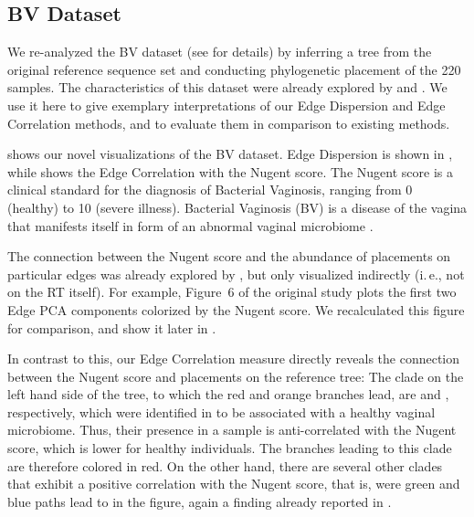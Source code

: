 \subsection{BV Dataset}
\label{ch:Visualization:sec:Results:sub:BVDataset}

We re-analyzed the \acf{BV} dataset (see  for details)
by inferring a tree from the original reference sequence set
and conducting phylogenetic placement of the \num{220} samples.
The characteristics of this dataset were already explored by  and .
We use it here to give exemplary interpretations of our Edge Dispersion and Edge Correlation methods,
and to evaluate them in comparison to existing methods.

 shows our novel visualizations of the \ac{BV} dataset.
Edge Dispersion is shown in ,
while  shows the Edge Correlation with the Nugent score. %
The Nugent score \cite{Nugent1991} is a clinical standard for the diagnosis of Bacterial Vaginosis,
ranging from \num{0} (healthy) to \num{10} (severe illness).
Bacterial Vaginosis (BV) is a disease of the vagina
that manifests itself in form of an abnormal vaginal microbiome \cite{Srinivasan2012}.

The connection between the Nugent score and the abundance of placements on particular edges
was already explored by , but only visualized indirectly (i.\,e., not on the \ac{RT} itself).
For example, Figure~6 of the original study \cite{Matsen2011a}
plots the first two Edge PCA components colorized by the Nugent score.
We recalculated this figure for comparison, and show it later in .

In contrast to this, our Edge Correlation measure directly reveals
the connection between the Nugent score and placements on the reference tree:
The clade on the left hand side of the tree, to which the red and orange branches lead,
are  and , respectively,
which were identified in  to be associated with a healthy vaginal microbiome.
Thus, their presence in a sample is anti-correlated with the Nugent score, which is lower for healthy individuals.
The branches leading to this clade are therefore colored in red.
On the other hand, there are several other clades that exhibit a positive correlation with the Nugent score,
that is, were green and blue paths lead to in the figure,
again a finding already reported in .

